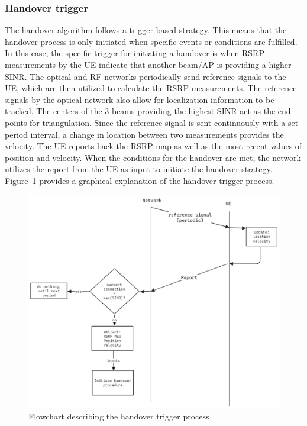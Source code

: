 \subsubsection{Handover trigger}
The handover algorithm follows a trigger-based strategy. This means that the handover process is only initiated when specific events or conditions are fulfilled. In this case, the specific trigger for initiating a handover is when RSRP measurements by the UE indicate that another beam/AP is providing a higher SINR. The optical and RF networks periodically send reference signals to the UE, which are then utilized to calculate the RSRP measurements. The reference signals by the optical network also allow for localization information to be tracked. The centers of the 3 beams providing the highest SINR act as the end points for triangulation. Since the reference signal is sent continuously with a set period interval, a change in location between two measurements provides the velocity. The UE reports back the RSRP map as well as the most recent values of position and velocity. When the conditions for the handover are met, the network utilizes the report from the UE as input to initiate the handover strategy. Figure~\ref{fig: handover-trigger} provides a graphical explanation of the handover trigger process.
% 
\begin{figure}
    \centering
    \includegraphics[width=0.75\linewidth]{Figures/handover-trigger.png}
    \caption{Flowchart describing the handover trigger process}
    \label{fig: handover-trigger}
\end{figure}


